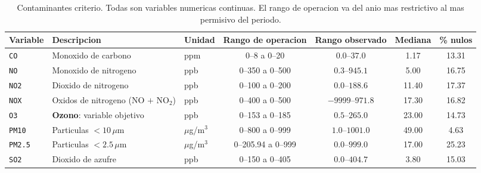 \begin{table}[pos=t]
  \centering
  \caption{Contaminantes criterio. Todas son variables numericas continuas. El
    rango de operacion va del anio mas restrictivo al mas permisivo del
    periodo.}
  \label{tab:dic-contaminantes}
  \small
  \begin{tabular}{lllcccc}
    \toprule
    Variable & Descripcion & Unidad & Rango de operacion & Rango observado & Mediana & \% nulos \\
    \midrule
    \texttt{CO}    & Monoxido de carbono                   & ppm             & 0--8 a 0--20       & $0.0$--$37.0$    & 1.17  & 13.31 \\
    \texttt{NO}    & Monoxido de nitrogeno                 & ppb             & 0--350 a 0--500    & $0.3$--$945.1$   & 5.00  & 16.75 \\
    \texttt{NO2}   & Dioxido de nitrogeno                  & ppb             & 0--100 a 0--200    & $0.0$--$188.6$   & 11.40 & 17.37 \\
    \texttt{NOX}   & Oxidos de nitrogeno (NO $+$ NO$_2$)   & ppb             & 0--400 a 0--500    & $-9999$--$971.8$ & 17.30 & 16.82 \\
    \texttt{O3}    & \textbf{Ozono}: variable objetivo     & ppb             & 0--153 a 0--185    & $0.5$--$265.0$   & 23.00 & 14.73 \\
    \texttt{PM10}  & Particulas $<10\,\mu$m                & $\mu$g/m$^3$    & 0--800 a 0--999    & $1.0$--$1001.0$  & 49.00 & 4.63  \\
    \texttt{PM2.5} & Particulas $<2.5\,\mu$m               & $\mu$g/m$^3$    & 0--205.94 a 0--999 & $0.0$--$999.0$   & 17.00 & 25.23 \\
    \texttt{SO2}   & Dioxido de azufre                     & ppb             & 0--150 a 0--405    & $0.0$--$404.7$   & 3.80  & 15.03 \\
    \bottomrule
  \end{tabular}
\end{table}

